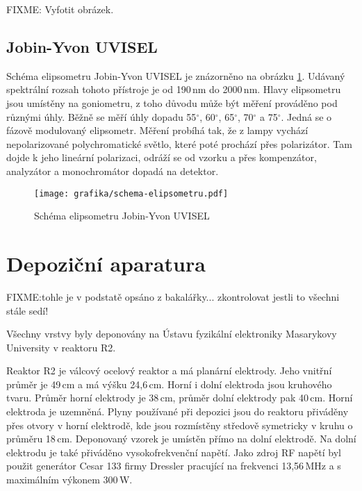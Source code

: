 FIXME: Vyfotit obrázek.


\subsection{Jobin-Yvon UVISEL}
Schéma elipsometru Jobin-Yvon UVISEL je znázorněno na obrázku \ref{elipsometrimg}. Udávaný spektrální rozsah tohoto přístroje je od 190\,nm do 2000\,nm. Hlavy elipsometru jsou umístěny na goniometru, z toho důvodu může být měření prováděno pod různými úhly. Běžně se měří úhly dopadu 55$^\circ$, 60$^\circ$, 65$^\circ$, 70$^\circ$ a 75$^\circ$. Jedná se o fázově modulovaný elipsometr. Měření probíhá tak, že z lampy vychází nepolarizované polychromatické světlo, které poté prochází přes polarizátor. Tam dojde k jeho lineární polarizaci, odráží se od vzorku a přes kompenzátor, analyzátor a monochromátor dopadá na detektor.

\begin{figure}
	\centering
	\texttt{[image: grafika/schema-elipsometru.pdf]}
	\caption{Schéma elipsometru Jobin-Yvon UVISEL}
	\label{elipsometrimg}
\end{figure}

\section{Depoziční aparatura}
FIXME:tohle je v podstatě opsáno z bakalářky... zkontrolovat jestli to všechni stále sedí!

Všechny vrstvy byly deponovány na Ústavu fyzikální elektroniky Masarykovy University v reaktoru R2. 

Reaktor R2 je válcový ocelový reaktor a má planární elektrody. Jeho vnitřní průměr je 49\,cm a má výšku 24,6\,cm. Horní i dolní elektroda jsou kruhového tvaru. Průměr horní elektrody je 38\,cm, průměr dolní elektrody pak 40\,cm. Horní elektroda je uzemněná. Plyny používané při depozici jsou do reaktoru přiváděny přes otvory v horní elektrodě, kde jsou rozmístěny středově symetricky v kru\-hu o průměru 18\,cm. Deponovaný vzorek je umístěn přímo na dolní elektrodě. Na dolní elektrodu je také přiváděno vysokofrekvenční napětí. Jako zdroj RF napětí byl použit generátor Cesar 133 firmy Dressler pracující na frekvenci 13,56\,MHz a s maximálním výkonem 300\,W.

